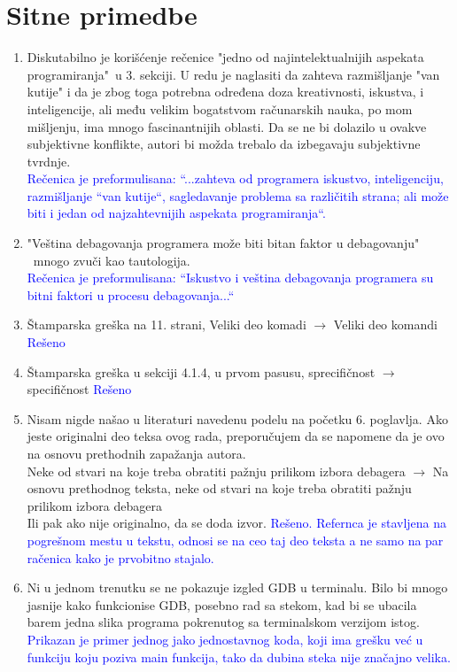 \documentclass[a4paper]{report}
\newcommand{\odgovor}[1]{\textcolor{blue}{#1}}
\begin{document}
\section{Sitne primedbe}
\begin{enumerate}
		
	\item Diskutabilno je korišćenje rečenice "jedno od najintelektualnijih aspekata programiranja"\ u 3. sekciji. U redu je naglasiti da zahteva razmišljanje "van kutije" i da je zbog toga potrebna određena doza kreativnosti, iskustva, i inteligencije, ali među velikim bogatstvom računarskih nauka, po mom mišljenju, ima mnogo fascinantnijih oblasti. Da se ne bi dolazilo u ovakve subjektivne konflikte, autori bi možda trebalo da izbegavaju subjektivne tvrdnje. \\
	\odgovor{Rečenica je preformulisana: ``...zahteva od programera iskustvo, inteligenciju, razmišljanje ``van kutije``, 		sagledavanje problema sa različitih strana; ali može biti i jedan od najzahtevnijih aspekata programiranja``.}
	\item "Veština debagovanja programera može biti bitan faktor u debagovanju" \ mnogo zvuči kao tautologija. \\
	\odgovor{Rečenica je preformulisana: ``Iskustvo i veština debagovanja programera su bitni faktori u procesu debagovanja...``}
	\item Štamparska greška na 11. strani, Veliki deo komadi $\rightarrow$ Veliki deo komandi
	\odgovor{Rešeno}
	\item Štamparska greška u sekciji 4.1.4, u prvom pasusu,  sprecifičnost $\rightarrow$ specifičnost
	\odgovor{Rešeno}
	\item Nisam nigde našao u literaturi navedenu podelu na početku 6. poglavlja. Ako jeste originalni deo teksa ovog rada, preporučujem da se napomene da je ovo na osnovu prethodnih zapažanja autora.
\\
 Neke od stvari na koje treba obratiti pažnju prilikom izbora debagera  $\rightarrow$  Na osnovu prethodnog teksta, neke od stvari na koje treba obratiti pažnju prilikom izbora debagera
\\
Ili pak ako nije originalno, da se doda izvor. 
\odgovor{Rešeno. Refernca je stavljena na pogrešnom mestu u tekstu, odnosi se na ceo taj deo teksta a ne samo na par račenica kako je prvobitno stajalo.}
\item Ni u jednom trenutku se ne pokazuje izgled GDB u terminalu. Bilo bi mnogo jasnije kako funkcionise GDB, posebno rad sa stekom, kad bi se ubacila barem 
jedna slika programa pokrenutog sa terminalskom verzijom istog.\\
 	\odgovor{Prikazan je primer jednog jako jednostavnog koda, koji ima grešku već u funkciju koju poziva main funkcija, tako da
 	dubina steka nije značajno velika.}
\end{enumerate}
\end{document}
